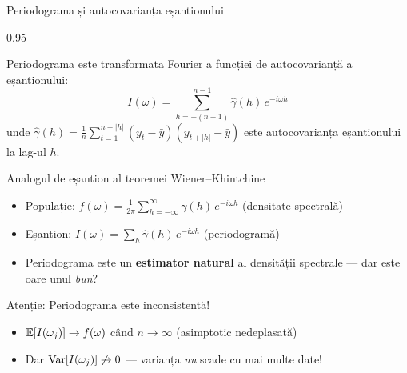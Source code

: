 \documentclass[9pt, aspectratio=169, t]{beamer}
\begin{document}
\begin{frame}{Periodograma și autocovarianța eșantionului}
    \begin{cminipage}{0.95\textwidth}
    \vspace{-3mm}
    \begin{thm}
        {\small Periodograma este transformata Fourier a funcției de autocovarianță a eșantionului:
        \vspace{-0.5em}
        \[
            I(\omega) = \sum_{h=-(n-1)}^{n-1} \hat{\gamma}(h) \, e^{-i\omega h}
        \]
        \vspace{-0.5em}
        unde $\hat{\gamma}(h) = \frac{1}{n}\sum_{t=1}^{n-|h|}(y_t - \bar{y})(y_{t+|h|} - \bar{y})$ este autocovarianța eșantionului la lag-ul $h$.}
    \end{thm}
    \vspace{-3mm}
    \begin{block}{Analogul de eșantion al teoremei Wiener--Khintchine}
        \begin{itemize}\setlength{\itemsep}{-2pt}
            \item Populație: $f(\omega) = \frac{1}{2\pi}\sum_{h=-\infty}^{\infty} \gamma(h)\,e^{-i\omega h}$ (densitate spectrală)
            \item Eșantion: $I(\omega) = \sum_{h} \hat{\gamma}(h)\,e^{-i\omega h}$ (periodogramă)
            \item Periodograma este un \textbf{estimator natural} al densității spectrale --- dar este oare unul \textit{bun}?
        \end{itemize}
    \end{block}
    \vspace{-2mm}
    \begin{alertblock}{Atenție: Periodograma este inconsistentă!}
        \begin{itemize}\setlength{\itemsep}{-2pt}
            \item $\mathbb{E}[I(\omega_j)] \to f(\omega)$ când $n \to \infty$ (asimptotic nedeplasată)
            \item Dar $\text{Var}[I(\omega_j)] \not\to 0$ --- varianța \textit{nu} scade cu mai multe date!
        \end{itemize}
    \end{alertblock}
    \end{cminipage}
\end{frame}
\end{document}

